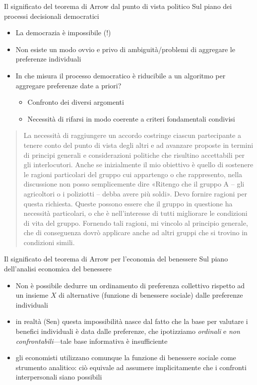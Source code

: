\documentclass[11pt]{beamer}
\begin{document}
\begin{frame}{Il significato del teorema di Arrow dal punto di vista politico}
Sul piano dei processi decisionali democratici
\begin{itemize}
\item La democrazia è impossibile (!)
\item Non esiste un modo ovvio e privo di ambiguità/problemi di aggregare le
preferenze individuali
\item In che misura il processo democratico è riducibile a un algoritmo per
aggregare preferenze date a priori?
\begin{itemize}
\item Confronto dei diversi argomenti
\item Necessità di rifarsi in modo coerente a criteri fondamentali condivisi
\end{itemize}
\end{itemize}

\begin{quotation}
\linespread{.9}\noindent\footnotesize La necessità di raggiungere un accordo costringe ciascun partecipante a tenere conto del punto di vista degli altri e ad avanzare proposte in termini di principi generali e considerazioni politiche che risultino accettabili per gli interlocutori. Anche se inizialmente il mio obiettivo è quello di sostenere le ragioni particolari del gruppo cui appartengo o che rappresento, nella discussione non posso semplicemente dire «Ritengo che il gruppo A -- gli agricoltori o i poliziotti -- debba avere più soldi». Devo fornire ragioni per questa richiesta. Queste possono essere che il gruppo in questione ha necessità particolari, o che è nell'interesse di tutti migliorare le condizioni di vita del gruppo. Fornendo tali ragioni, mi vincolo al principio generale, che di conseguenza dovrò applicare anche ad altri gruppi che si trovino in condizioni simili.
\end{quotation}
\end{frame}

\begin{frame}{Il significato del teorema di Arrow per l'economia del benessere}
Sul piano dell'analisi economica del benessere
\begin{itemize}
\item Non è possibile dedurre un ordinamento di preferenza collettivo rispetto ad
un insieme $X$ di alternative (funzione di benessere sociale) dalle
preferenze individuali
\item in realtà (Sen) questa impossibilità nasce dal fatto che la base per
valutare i benefici individuali è data dalle preferenze, che ipotizziamo
\emph{ordinali} e \emph{non confrontabili}---tale base informativa è insufficiente
\item gli economisti utilizzano comunque la funzione di benessere sociale come
strumento analitico: ciò equivale ad assumere implicitamente che i confronti
interpersonali siano possibili
\end{itemize}
\end{frame}
\end{document}
